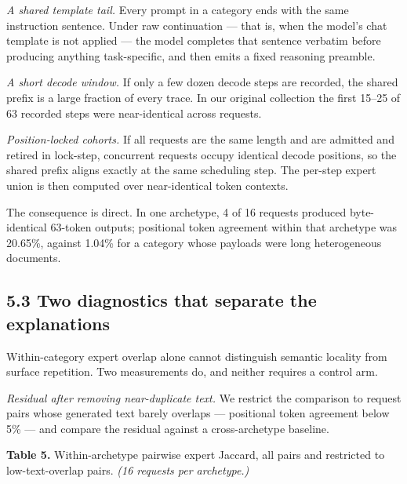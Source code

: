 \documentclass[
  10pt,
  letterpaper,
  10pt]{article}
\begin{document}
\emph{A shared template tail.} Every prompt in a category ends with the
same instruction sentence. Under raw continuation --- that is, when the
model's chat template is not applied --- the model completes that
sentence verbatim before producing anything task-specific, and then
emits a fixed reasoning preamble.

\emph{A short decode window.} If only a few dozen decode steps are
recorded, the shared prefix is a large fraction of every trace. In our
original collection the first 15--25 of 63 recorded steps were
near-identical across requests.

\emph{Position-locked cohorts.} If all requests are the same length and
are admitted and retired in lock-step, concurrent requests occupy
identical decode positions, so the shared prefix aligns exactly at the
same scheduling step. The per-step expert union is then computed over
near-identical token contexts.

The consequence is direct. In one archetype, 4 of 16 requests produced
byte-identical 63-token outputs; positional token agreement within that
archetype was 20.65\%, against 1.04\% for a category whose payloads were
long heterogeneous documents.

\subsection{5.3 Two diagnostics that separate the
explanations}\label{two-diagnostics-that-separate-the-explanations}

Within-category expert overlap alone cannot distinguish semantic
locality from surface repetition. Two measurements do, and neither
requires a control arm.

\emph{Residual after removing near-duplicate text.} We restrict the
comparison to request pairs whose generated text barely overlaps ---
positional token agreement below 5\% --- and compare the residual
against a cross-archetype baseline.

\textbf{Table 5.} Within-archetype pairwise expert Jaccard, all pairs
and restricted to low-text-overlap pairs. \emph{(16 requests per
archetype.)}
\end{document}
